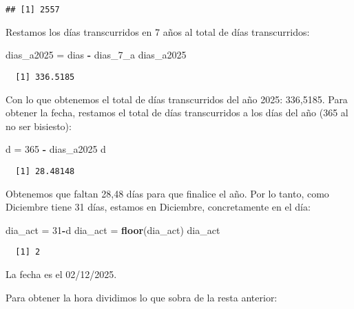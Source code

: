 \documentclass[]{article}
\newenvironment{Shaded}{\begin{snugshade}}{\end{snugshade}}
\newcommand{\DecValTok}[1]{\textcolor[rgb]{0.00,0.00,0.81}{#1}}
\newcommand{\KeywordTok}[1]{\textcolor[rgb]{0.13,0.29,0.53}{\textbf{#1}}}
\newcommand{\NormalTok}[1]{#1}
\newcommand{\OperatorTok}[1]{\textcolor[rgb]{0.81,0.36,0.00}{\textbf{#1}}}
\newcommand{\StringTok}[1]{\textcolor[rgb]{0.31,0.60,0.02}{#1}}
\begin{document}
\begin{verbatim}
## [1] 2557
\end{verbatim}

Restamos los días transcurridos en 7 años al total de días
transcurridos:

\begin{Shaded}
\begin{Highlighting}[]
\NormalTok{dias_a2025 =}\StringTok{ }\NormalTok{dias }\OperatorTok{-}\StringTok{ }\NormalTok{dias_}\DecValTok{7}\NormalTok{_a}
\NormalTok{dias_a2025}
\end{Highlighting}
\end{Shaded}

\begin{verbatim}
  [1] 336.5185
\end{verbatim}

Con lo que obtenemos el total de días transcurridos del año 2025:
336,5185. Para obtener la fecha, restamos el total de días transcurridos
a los días del año (365 al no ser bisiesto):

\begin{Shaded}
\begin{Highlighting}[]
\NormalTok{d =}\StringTok{ }\DecValTok{365} \OperatorTok{-}\StringTok{ }\NormalTok{dias_a2025}
\NormalTok{d}
\end{Highlighting}
\end{Shaded}

\begin{verbatim}
  [1] 28.48148
\end{verbatim}

Obtenemos que faltan 28,48 días para que finalice el año. Por lo tanto,
como Diciembre tiene 31 días, estamos en Diciembre, concretamente en el
día:

\begin{Shaded}
\begin{Highlighting}[]
\NormalTok{dia_act =}\StringTok{ }\DecValTok{31}\OperatorTok{-}\NormalTok{d}
\NormalTok{dia_act =}\StringTok{ }\KeywordTok{floor}\NormalTok{(dia_act)}
\NormalTok{dia_act}
\end{Highlighting}
\end{Shaded}

\begin{verbatim}
  [1] 2
\end{verbatim}

La fecha es el 02/12/2025.

Para obtener la hora dividimos lo que sobra de la resta anterior:
\end{document}
